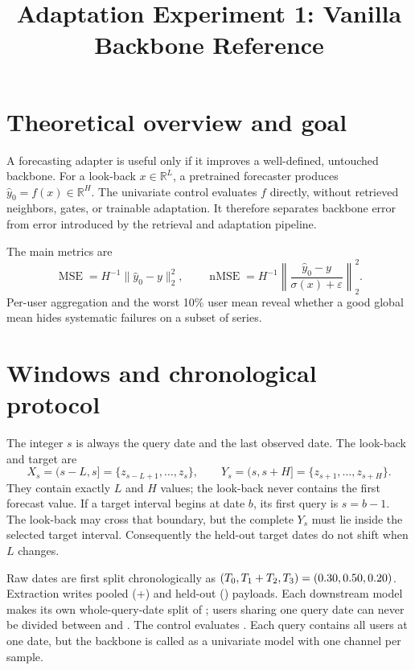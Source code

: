 \documentclass[10pt]{article}
\title{Adaptation Experiment 1: Vanilla Backbone Reference}
\author{}
\date{}
\begin{document}
\maketitle

\section{Theoretical overview and goal}
A forecasting adapter is useful only if it improves a well-defined, untouched
backbone.  For a look-back $x\in\mathbb{R}^{L}$, a pretrained forecaster produces
$\hat y_0=f(x)\in\mathbb{R}^{H}$.  The univariate control evaluates $f$ directly,
without retrieved neighbors, gates, or trainable adaptation.  It therefore
separates backbone error from error introduced by the retrieval and adaptation
pipeline.

The main metrics are
\[
 \operatorname{MSE}=H^{-1}\lVert \hat y_0-y\rVert_2^2,
 \qquad
 \operatorname{nMSE}=H^{-1}\left\lVert
 \frac{\hat y_0-y}{\sigma(x)+\varepsilon}\right\rVert_2^2.
\]
Per-user aggregation and the worst 10\% user mean reveal whether a good global
mean hides systematic failures on a subset of series.


\section{Windows and chronological protocol}
The integer $s$ is always the query date and the last observed date. The
look-back and target are
\[
 X_s=(s-L,s]=\{z_{s-L+1},\ldots,z_s\},\qquad
 Y_s=(s,s+H]=\{z_{s+1},\ldots,z_{s+H}\}.
\]
They contain exactly $L$ and $H$ values; the look-back never contains the
first forecast value. If a target interval begins at date $b$, its first query
is $s=b-1$. The look-back may cross that boundary, but the complete $Y_s$ must
lie inside the selected target interval. Consequently the held-out \Tthree
target dates do not shift when $L$ changes.

Raw dates are first split chronologically as
$(T_0,T_1+T_2,T_3)=(0.30,0.50,0.20)$. Extraction writes pooled
 (\Tone+\Ttwo) and held-out  (\Tthree) payloads.
Each downstream model makes its own whole-query-date split of ;
users sharing one query date can never be divided between \Tone and \Ttwo.
The control evaluates \Tthree. Each query contains all users at one date, but
the backbone is called as a univariate model with one channel per sample.
\end{document}
